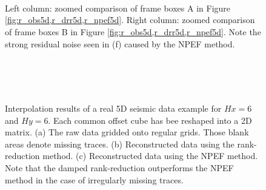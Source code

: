 {\begin{figure}[htb!]
   \centering
   \\
   \\
   \\
\caption{Left column: zoomed comparison of frame boxes A in Figure \ref{fig:r_obs5d,r_drr5d,r_npef5d}. Right column: zoomed comparison of frame boxes B in Figure \ref{fig:r_obs5d,r_drr5d,r_npef5d}. Note the strong residual noise seen in (f) caused by the NPEF method. }
\label{fig:r_obs5d1a,r_obs5d1b,r_drr5d1a,r_drr5d1b,r_npef5d1a,r_npef5d1b}
\end{figure}




\begin{figure}[htb!]
   \centering
   \\
   \\
   \\
\caption{Interpolation results of a real 5D seismic data example for $Hx=6$ and $Hy=6$. Each common offset cube has bee reshaped into a 2D matrix. (a) The raw data gridded onto regular grids. Those blank areas denote missing traces. (b) Reconstructed data using the rank-reduction method. (c) Reconstructed data using the NPEF method. Note that the damped rank-reduction outperforms the NPEF method in the case of irregularly missing traces.}
\label{fig:r_obs5d4,r_drr5d4,r_npef5d4}
\end{figure}



}
